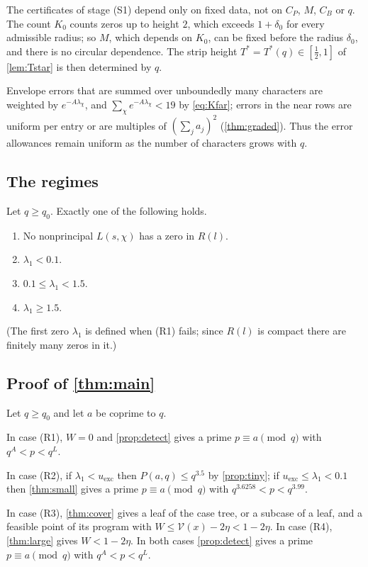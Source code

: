 The certificates of stage (S1) depend only on fixed data, not on $C_P$, $M$, $C_B$ or $q$. The
count $K_0$ counts zeros up to height $2$, which exceeds $1+\delta_0$ for every admissible radius;
so $M$, which depends on $K_0$, can be fixed before the radius $\delta_0$, and there is no circular
dependence. The strip height $T^*=T^*(q)\in[\frac12,1]$ of \cref{lem:Tstar} is then determined by $q$.

Envelope errors that are summed over unboundedly many characters are weighted by
$e^{-A\lambda_\chi}$, and $\sum_\chi e^{-A\lambda_\chi}<19$ by \eqref{eq:Kfar}; errors in the near rows are
uniform per entry or are multiples of $(\sum_ja_j)^2$ (\cref{thm:graded}). Thus the error
allowances remain uniform as the number of characters grows with $q$.

\subsection{The regimes}
Let $q\ge q_0$. Exactly one of the following holds.
\begin{enumerate}[(R1)]
  \item No nonprincipal $L(s,\chi)$ has a zero in $R(l)$.
  \item $\lambda_1<0.1$.
  \item $0.1\le\lambda_1<1.5$.
  \item $\lambda_1\ge1.5$.
\end{enumerate}
(The first zero $\lambda_1$ is defined when (R1) fails; since $R(l)$ is compact there are finitely
many zeros in it.)

\subsection{Proof of \texorpdfstring{\cref{thm:main}}{the main theorem}}
Let $q\ge q_0$ and let $a$ be coprime to $q$.

In case (R1), $W=0$ and \cref{prop:detect} gives a prime $p\equiv a\pmod q$ with $q^A<p<q^L$.

In case (R2), if $\lambda_1<u_{\mathrm{exc}}$ then $P(a,q)\le q^{3.5}$ by \cref{prop:tiny}; if $u_{\mathrm{exc}}\le\lambda_1<0.1$ then
\cref{thm:small} gives a prime $p\equiv a\pmod q$ with $q^{3.6258}<p<q^{3.99}$.

In case (R3), \cref{thm:cover} gives a leaf of the case tree, or a subcase of a leaf, and a
feasible point of its program with $W\le\mathcal V(x)-2\eta<1-2\eta$. In case (R4), \cref{thm:large}
gives $W<1-2\eta$. In both cases \cref{prop:detect} gives a prime $p\equiv a\pmod q$ with
$q^A<p<q^L$.

